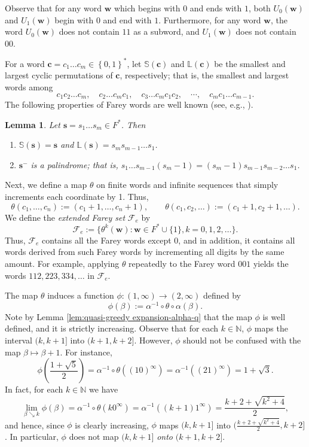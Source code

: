 \documentclass[11pt]{amsart}
\newtheorem{lemma}[theorem]{Lemma}
\theoremstyle{definition}
\theoremstyle{remark}
\numberwithin{equation}{section}
\newcommand{\N}{\ensuremath{\mathbb{N}}}
\renewcommand{\L}{\ensuremath{\mathbb{L}}}
\renewcommand{\S}{\ensuremath{\mathbb{S}}}
\newcommand{\F}{F^*}
\newcommand{\cF}{\mathcal{F}}
\newcommand{\s}{ {\mathbf{s}}}
\newcommand{\w}{\mathbf{w}}
\newcommand{\set}[1]{\left\{#1\right\}}
\newcommand{\f}{\infty}
\newcommand{\al}{\alpha}
\begin{document}
Observe that for any word $\w$ which begins with $0$ and ends with $1$, both $U_0(\w)$ and $U_1(\w)$ begin with $0$ and end with $1$. Furthermore, for any word $\w$, the word $U_0(\w)$ does not contain $11$ as a subword, and $U_1(\w)$ does not contain $00$.

For a word $\mathbf c=c_1\ldots c_m\in\set{0,1}^*$, let $\S(\mathbf c)$ and $\L(\mathbf c)$ be the smallest and largest cyclic permutations of $\mathbf c$, respectively; that is, the smallest and largest words among
\[
c_1c_2\ldots c_m, \quad c_2\ldots c_m c_1,\quad c_3\ldots c_m c_1c_2,\quad \cdots,\quad c_mc_1\ldots c_{m-1}.
\]
The following properties of Farey words are well known (see, e.g., \cite[Proposition 2.5]{Carminati-Isola-Tiozzo-2018}).

\begin{lemma}  \label{lem:Farey-property}
Let $\s=s_1\ldots s_m\in\F$. Then
\begin{enumerate}[{\rm (i)}]
\item $\S(\s)=\s$ and $\L(\s)=s_ms_{m-1}\ldots s_1$.
\item ${\s^-}$ is a palindrome; that is, $s_1\ldots s_{m-1}(s_m-1)=(s_m-1)s_{m-1}s_{m-2}\ldots s_1$.
\end{enumerate}
\end{lemma}

{Next, we define a map $\theta$ on finite words and infinite sequences that simply increments each coordinate by 1. Thus,
\begin{equation} \label{eq:theta}
\theta(c_1,\dots,c_n):=(c_1+1,\dots,c_n+1), \qquad \theta(c_1,c_2,\dots):=(c_1+1,c_2+1,\dots).
\end{equation}
We define the {\em extended Farey set} $\cF_e$ by
\[
\cF_e:=\{\theta^k(\w): \w\in \F\cup\{1\}, k=0,1,2,\dots\}.
\]
Thus, $\cF_e$ contains all the Farey words except $0$, and in addition, it contains all words derived from such Farey words by incrementing all digits by the same amount. For example, applying $\theta$ repeatedly to the Farey word $001$ yields the words $112, 223, 334, \dots$ in $\cF_e$.

The map $\theta$ induces a function $\phi:(1,\f)\to(2,\f)$ defined by
\[
\phi(\beta):=\al^{-1}\circ \theta \circ \al(\beta).
\]
Note by Lemma \ref{lem:quasi-greedy expansion-alpha-q} that the map $\phi$ is well defined, and it is strictly increasing.
Observe that for each $k\in\N$, $\phi$ maps the interval $(k,k+1]$ into $(k+1,k+2]$. 
However, $\phi$ should not be confused with the map $\beta\mapsto \beta+1$. For instance,
\[
\phi\left(\frac{1+\sqrt{5}}{2}\right)=\al^{-1}\circ\theta((10)^\f)=\al^{-1}((21)^\f)=1+\sqrt{3}.
\]
In fact, for each $k\in\N$ we have
\[
 \lim_{\beta\searrow k} \phi(\beta)=\al^{-1}\circ\theta(k0^\f)=\al^{-1}((k+1)1^\f)=\frac{k+2+\sqrt{k^2+4}}{2},
\]
and hence, since $\phi$ is clearly increasing, $\phi$ maps $(k,k+1]$ into $(\frac{k+2+\sqrt{k^2+4}}{2},k+2]$. In particular, $\phi$ does not map $(k,k+1]$ {\em onto} $(k+1,k+2]$.
}
\end{document}
